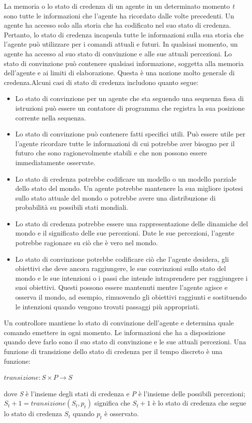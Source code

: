\documentclass[a4paper]{extarticle}
\begin{document}
La memoria o lo stato di credenza di un agente in un determinato momento \textit{t} sono tutte le informazioni che l'agente ha ricordato dalle volte precedenti. Un agente ha accesso solo alla storia che ha codificato nel suo stato di credenza. Pertanto, lo stato di credenza incapsula tutte le informazioni sulla sua storia che l'agente può utilizzare per i comandi attuali e futuri. In qualsiasi momento, un agente ha accesso al suo stato di convinzione e alle sue attuali percezioni. Lo stato di convinzione può contenere qualsiasi informazione, soggetta alla memoria dell'agente e ai limiti di elaborazione. Questa è una nozione molto generale di credenza.Alcuni casi di stato di credenza includono quanto segue:
\begin{itemize}
\item Lo stato di convinzione per un agente che sta seguendo una sequenza fissa di istruzioni può essere un contatore di programma che registra la sua posizione corrente nella sequenza.
\item Lo stato di convinzione può contenere fatti specifici utili. Può essere utile per l'agente ricordare tutte le informazioni di cui potrebbe aver bisogno per il futuro che sono ragionevolmente stabili e che non possono essere immediatamente osservate.
\item Lo stato di credenza potrebbe codificare un modello o un modello parziale dello stato del mondo. Un agente potrebbe mantenere la sua migliore ipotesi sullo stato attuale del mondo o potrebbe avere una distribuzione di probabilità su possibili stati mondiali.
\item Lo stato di credenza potrebbe essere una rappresentazione delle dinamiche del mondo e il significato delle sue percezioni. Date le sue percezioni, l'agente potrebbe ragionare su ciò che è vero nel mondo.
\item Lo stato di convinzione potrebbe codificare ciò che l'agente desidera, gli obiettivi che deve ancora raggiungere, le sue convinzioni sullo stato del mondo e le sue intenzioni o i passi che intende intraprendere per raggiungere i suoi obiettivi. Questi possono essere mantenuti mentre l'agente agisce e osserva il mondo, ad esempio, rimuovendo gli obiettivi raggiunti e sostituendo le intenzioni quando vengono trovati passaggi più appropriati.
\end{itemize}

Un controllore mantiene lo stato di convinzione dell'agente e determina quale comando emettere in ogni momento. Le informazioni che ha a disposizione quando deve farlo sono il suo stato di convinzione e le sue attuali percezioni. Una funzione di transizione dello stato di credenza per il tempo discreto è una funzione:
\begin{center}
$transizione : S \times P \rightarrow S$
\end{center}
dove \textit{S} è l'insieme degli stati di credenza e \textit{P} è l'insieme delle possibili percezioni; $S_t+1 = transizione(S_t,p_t)$ significa che $ S_t+1$ è lo stato di credenza che segue lo stato di credenza $S_t$ quando $p_t$ è osservato.
\end{document}
